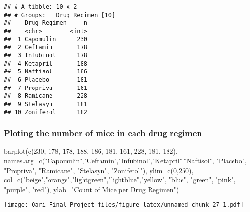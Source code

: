 \documentclass[
]{article}
\newenvironment{Shaded}{\begin{snugshade}}{\end{snugshade}}
\newcommand{\AttributeTok}[1]{\textcolor[rgb]{0.77,0.63,0.00}{#1}}
\newcommand{\DecValTok}[1]{\textcolor[rgb]{0.00,0.00,0.81}{#1}}
\newcommand{\FunctionTok}[1]{\textcolor[rgb]{0.00,0.00,0.00}{#1}}
\newcommand{\NormalTok}[1]{#1}
\newcommand{\StringTok}[1]{\textcolor[rgb]{0.31,0.60,0.02}{#1}}
\begin{document}
\begin{verbatim}
## # A tibble: 10 x 2
## # Groups:   Drug_Regimen [10]
##    Drug_Regimen     n
##    <chr>        <int>
##  1 Capomulin      230
##  2 Ceftamin       178
##  3 Infubinol      178
##  4 Ketapril       188
##  5 Naftisol       186
##  6 Placebo        181
##  7 Propriva       161
##  8 Ramicane       228
##  9 Stelasyn       181
## 10 Zoniferol      182
\end{verbatim}

\hypertarget{ploting-the-number-of-mice-in-each-drug-regimen}{%
\subsubsection{Ploting the number of mice in each drug
regimen}\label{ploting-the-number-of-mice-in-each-drug-regimen}}

\begin{Shaded}
\begin{Highlighting}[]
\FunctionTok{barplot}\NormalTok{(}\FunctionTok{c}\NormalTok{(}\DecValTok{230}\NormalTok{, }\DecValTok{178}\NormalTok{, }\DecValTok{178}\NormalTok{, }\DecValTok{188}\NormalTok{, }\DecValTok{186}\NormalTok{, }\DecValTok{181}\NormalTok{, }\DecValTok{161}\NormalTok{, }\DecValTok{228}\NormalTok{, }\DecValTok{181}\NormalTok{, }\DecValTok{182}\NormalTok{),}
        \AttributeTok{names.arg=}\FunctionTok{c}\NormalTok{(}\StringTok{"Capomulin"}\NormalTok{,}\StringTok{"Ceftamin"}\NormalTok{,}\StringTok{"Infubinol"}\NormalTok{,}\StringTok{"Ketapril"}\NormalTok{,}\StringTok{"Naftisol"}\NormalTok{, }\StringTok{"Placebo"}\NormalTok{, }\StringTok{"Propriva"}\NormalTok{, }\StringTok{"Ramicane"}\NormalTok{, }\StringTok{"Stelasyn"}\NormalTok{, }\StringTok{"Zoniferol"}\NormalTok{),}
        \AttributeTok{ylim=}\FunctionTok{c}\NormalTok{(}\DecValTok{0}\NormalTok{,}\DecValTok{250}\NormalTok{),}
        \AttributeTok{col=}\FunctionTok{c}\NormalTok{(}\StringTok{"beige"}\NormalTok{,}\StringTok{"orange"}\NormalTok{,}\StringTok{"lightgreen"}\NormalTok{,}\StringTok{"lightblue"}\NormalTok{,}\StringTok{"yellow"}\NormalTok{, }\StringTok{"blue"}\NormalTok{, }\StringTok{"green"}\NormalTok{, }\StringTok{"pink"}\NormalTok{, }\StringTok{"purple"}\NormalTok{, }\StringTok{"red"}\NormalTok{),}
        \AttributeTok{ylab=}\StringTok{"Count of Mice per Drug Regimen"}\NormalTok{)}
\end{Highlighting}
\end{Shaded}

\texttt{[image: Qari\_Final\_Project\_files/figure-latex/unnamed-chunk-27-1.pdf]}
\end{document}
